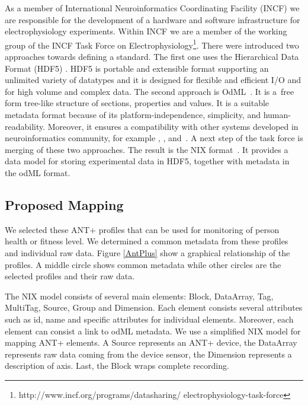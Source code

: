 \documentclass[conference]{IEEEtran}
\begin{document}
As a member of International Neuroinformatics Coordinating Facility (INCF) \cite{wvangeit:Bjaalie:JNeurosci:2007} we are responsible for the development of a hardware and software infrastructure for electrophysiology experiments. Within INCF we are a member of the working group of the INCF Task Force on Electrophysiology\footnote{http://www.incf.org/programs/datasharing/ electrophysiology-task-force}. There were introduced two approaches towards defining a standard. The first one uses the Hierarchical Data Format (HDF5) \cite{hdf5}. HDF5 is portable and extensible format supporting an unlimited variety of datatypes and it is designed for flexible and efficient I/O and for high volume and complex data. The second approach is OdML~\cite{10.3389/fninf.2011.00016}. It is a~free form tree-like structure of sections, properties and values. It is a suitable metadata format because of its platform-independence, simplicity, and human-readability. Moreover, it ensures a compatibility with other systems developed in neuroinformatics community, for example \cite{10.3389/conf.fninf.2014.18.00029}, \cite{10.3389/conf.fninf.2014.18.00053}, and~\cite{10.3389/conf.fninf.2013.09.00025}. A next step of the task force is merging of these two approaches\cite{10.3389/conf.fninf.2013.09.00069}. The result is the NIX format~\cite{Stoewer:2014}. It provides a data model for storing experimental data in HDF5, together with metadata in the odML format.




\subsection{Proposed Mapping}

We selected these ANT+ profiles that can be used for monitoring of person health or fitness level. We determined a common metadata from these profiles and individual raw data. Figure \ref{AntPlus} show a graphical relationship of the profiles. A middle circle shows common metadata while other circles are the selected profiles and their raw data. 

The NIX model consists of several main elements: Block, DataArray, Tag, MultiTag, Source, Group and Dimension. Each element consists several attributes such as id, name and specific attributes for individual elements. Moreover, each element can consist a link to odML metadata. We use a simplified NIX model for mapping ANT+ elements. A Source represents an ANT+ device, the DataArray represents raw data coming from the device sensor, the Dimension represents a description of axis. Last, the Block wraps complete recording.
\end{document}
